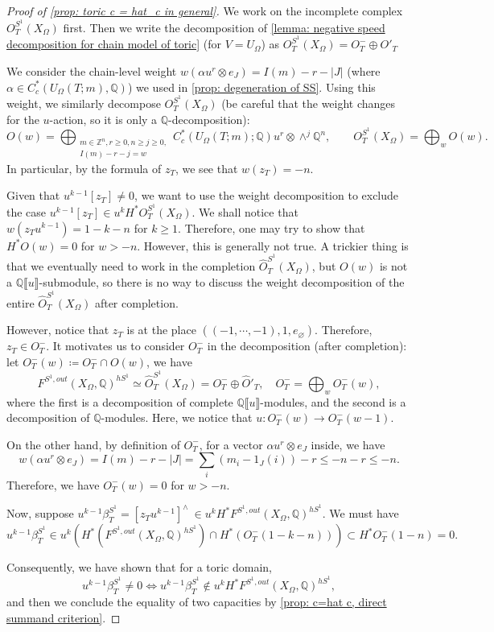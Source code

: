 \documentclass[11pt]{amsart}
\numberwithin{equation}{section}
\theoremstyle{plain}
\theoremstyle{definition}
\theoremstyle{remark}
\newcommand{\bQ} { {\mathbb{Q}}}
\newcommand{\bZ} { {\mathbb{Z}}}
\newcommand{\fpw}[1]{{\llbracket #1\rrbracket}}
\begin{document}
\begin{proof}[Proof of \autoref{prop: toric c = hat_c in general}] 
We work on the incomplete complex $O^{S^1}_{T}(X_\Omega)$ first. Then we write the decomposition of \autoref{lemma: negative speed decomposition for chain model of toric} (for $V=U_\Omega$) as $O^{S^1}_{T}(X_\Omega)=O^-_T\oplus O'_T$



We consider the chain-level weight $w(\alpha u^r\otimes e_J)=I(m)-r-|J|$ (where $\alpha\in C_c^{*} (U_\Omega(T;m),\bQ)$) we used in \autoref{prop: degeneration of SS}.  Using this weight, we similarly decompose $O^{S^1}_{T}(X_\Omega)$ (be careful that the weight changes for the $u$-action, so it is only a $\bQ$-decomposition):
\[O(w)=\bigoplus_{\substack{m\in \bZ^n,r\geq 0,n\geq j\geq 0,\\I(m)-r-j=w}}C_c^*({U_\Omega(T;m)} ;\bQ )  u^r \otimes\wedge^j\bQ^n,\qquad O^{S^1}_{T}(X_\Omega)=\bigoplus_w O(w).\]
In particular, by the formula of $z_T$, we see that $w(z_T)=-n$.


Given that $u^{k-1}[z_T] \neq 0$, we want to use the weight decomposition to exclude the case $u^{k-1}[z_T]\in u^{k}H^*O^{S^1}_{T}(X_\Omega)$. We shall notice that $w(z_T u^{k-1})=1-k-n$ for $k\geq 1$. Therefore, one may try to show that $H^*O(w)=0$ for $w>-n$. However, this is generally not true. A trickier thing is that we eventually need to work in the completion $\widehat O^{S^1}_{T}(X_\Omega)$, but $O(w)$ is not a $\bQ\fpw{u}$-submodule, so there is no way to discuss the weight decomposition of the entire $\widehat O^{S^1}_{T}(X_\Omega)$ after completion.

However, notice that $z_T$ is at the place $((-1,\cdots,-1),1,e_{\varnothing})$. Therefore, $z_T\in O_T^-$. It motivates us to consider $O_T^-$ in the decomposition (after completion): let $O_T^-(w)\coloneqq O_T^-\cap O(w)$, we have
\[F^{S^1,out}(X_\Omega,\bQ)^{hS^1}\simeq \widehat{O}^{S^1}_{T}(X_\Omega)=O_T^-\oplus \widehat O'_T, \quad O_T^-=\bigoplus_w O_T^-(w),\]
where the first is a decomposition of complete $\bQ\fpw{u}$-modules, and the second is a decomposition of $\bQ$-modules. Here, we notice that $u:O_T^-(w) \to O_T^-(w-1)$. 

On the other hand, by definition of $O_T^-$, for a vector $\alpha u^r\otimes e_J$ inside, we have
\[w(\alpha u^r\otimes e_J)=I(m)-r-|J|=\sum_i (m_i-1_J(i))-r\leq -n-r\leq -n.\]
Therefore, we have $O_T^-(w)=0$ for $w>-n$. 

Now, suppose $u^{k-1}\beta_T^{S^1}=[z_T u^{k-1}]^\wedge ~\in u^k H^*F^{S^1,out}(X_\Omega,\bQ)^{hS^1}$. We must have 
\[u^{k-1}\beta_T^{S^1}\in u^k \left(H^*(F^{S^1,out}(X_\Omega,\bQ)^{hS^1})\cap  H^*( O^-_T(1-k-n))\right)\subset H^*O^-_T(1-n)=0.\] 

Consequently, we have shown that for a toric domain, 
\[u^{k-1}\beta_T^{S^1}\neq 0\iff u^{k-1}\beta_T^{S^1} \notin u^k H^*F^{S^1,out}(X_\Omega,\bQ)^{hS^1},\]
and then we conclude the equality of two capacities by \autoref{prop: c=hat c, direct summand criterion}.
\end{proof}
\end{document}
